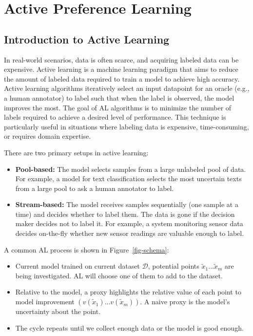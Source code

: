 \documentclass[
  letterpaper,
  numbers=noenddot,
  DIV=11]{scrreprt}
\theoremstyle{plain}
\theoremstyle{definition}
\theoremstyle{plain}
\theoremstyle{remark}
\begin{document}
\section{Active Preference Learning}\label{active-preference-learning}

\subsection{Introduction to Active
Learning}\label{introduction-to-active-learning}

In real-world scenarios, data is often scarce, and acquiring labeled
data can be expensive. Active learning is a machine learning paradigm
that aims to reduce the amount of labeled data required to train a model
to achieve high accuracy. Active learning algorithms iteratively select
an input datapoint for an oracle (e.g., a human annotator) to label such
that when the label is observed, the model improves the most. The goal
of AL algorithms is to minimize the number of labels required to achieve
a desired level of performance. This technique is particularly useful in
situations where labeling data is expensive, time-consuming, or requires
domain expertise.

There are two primary setups in active learning:

\begin{itemize}
\item
  \textbf{Pool-based:} The model selects samples from a large unlabeled
  pool of data. For example, a model for text classification selects the
  most uncertain texts from a large pool to ask a human annotator to
  label.
\item
  \textbf{Stream-based:} The model receives samples sequentially (one
  sample at a time) and decides whether to label them. The data is gone
  if the decision maker decides not to label it. For example, a system
  monitoring sensor data decides on-the-fly whether new sensor readings
  are valuable enough to label.
\end{itemize}

A common AL process is shown in Figure~\ref{fig-schema}:

\begin{itemize}
\item
  Current model trained on current dataset \(\mathcal{D}\), potential
  points \(\tilde{x}_1 \dots \tilde{x}_m\) are being investigated. AL
  will choose one of them to add to the dataset.
\item
  Relative to the model, a proxy highlights the relative value of each
  point to model improvement \((v(\tilde{x}_1) \dots v(\tilde{x}_m) )\).
  A naive proxy is the model's uncertainty about the point.
\item
  The cycle repeats until we collect enough data or the model is good
  enough.
\end{itemize}
\end{document}
